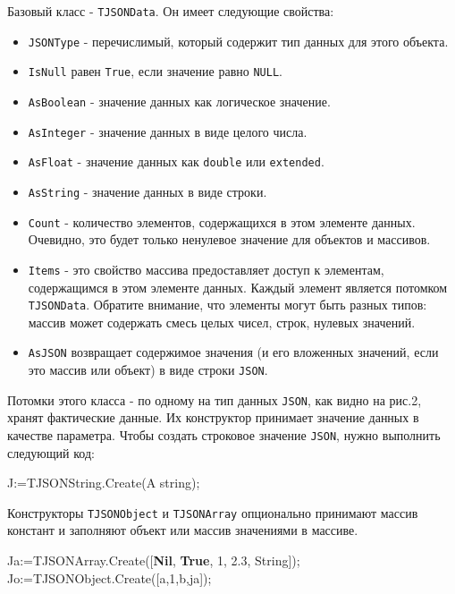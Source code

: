 \documentclass[
]{article}
\newenvironment{Shaded}{}{}
\newcommand{\DecValTok}[1]{\textcolor[rgb]{0.25,0.63,0.44}{#1}}
\newcommand{\KeywordTok}[1]{\textcolor[rgb]{0.00,0.44,0.13}{\textbf{#1}}}
\newcommand{\NormalTok}[1]{#1}
\newcommand{\StringTok}[1]{\textcolor[rgb]{0.25,0.44,0.63}{#1}}
\begin{document}
Базовый класс - \texttt{TJSONData}. Он имеет следующие свойства:

\begin{itemize}
\item
  \texttt{JSONType} - перечислимый, который содержит тип данных для
  этого объекта.
\item
  \texttt{IsNull} равен \texttt{True}, если значение равно
  \texttt{NULL}.
\item
  \texttt{AsBoolean} - значение данных как логическое значение.
\item
  \texttt{AsInteger} - значение данных в виде целого числа.
\item
  \texttt{AsFloat} - значение данных как \texttt{double} или
  \texttt{extended}.
\item
  \texttt{AsString} - значение данных в виде строки.
\item
  \texttt{Count} - количество элементов, содержащихся в этом элементе
  данных. Очевидно, это будет только ненулевое значение для объектов и
  массивов.
\item
  \texttt{Items} - это свойство массива предоставляет доступ к
  элементам, содержащимся в этом элементе данных. Каждый элемент
  является потомком \texttt{TJSONData}. Обратите внимание, что элементы
  могут быть разных типов: массив может содержать смесь целых чисел,
  строк, нулевых значений.
\item
  \texttt{AsJSON} возвращает содержимое значения (и его вложенных
  значений, если это массив или объект) в виде строки \texttt{JSON}.
\end{itemize}

Потомки этого класса - по одному на тип данных \texttt{JSON}, как видно
на рис.2, хранят фактические данные. Их конструктор принимает значение
данных в качестве параметра. Чтобы создать строковое значение
\texttt{JSON}, нужно выполнить следующий код:

\begin{Shaded}
\begin{Highlighting}[]
\NormalTok{J:=TJSONString.Create(}\StringTok{\textquotesingle{}A string\textquotesingle{}}\NormalTok{);}
\end{Highlighting}
\end{Shaded}

Конструкторы \texttt{TJSONObject} и \texttt{TJSONArray} опционально
принимают массив констант и заполняют объект или массив значениями в
массиве.

\begin{Shaded}
\begin{Highlighting}[]
\NormalTok{Ja:=TJSONArray.Create([}\KeywordTok{Nil}\NormalTok{, }\KeywordTok{True}\NormalTok{, }\DecValTok{1}\NormalTok{, }\DecValTok{2.3}\NormalTok{, }\StringTok{\textquotesingle{}String\textquotesingle{}}\NormalTok{]); }
\NormalTok{Jo:=TJSONObject.Create([}\StringTok{\textquotesingle{}a\textquotesingle{}}\NormalTok{,}\DecValTok{1}\NormalTok{,}\StringTok{\textquotesingle{}b\textquotesingle{}}\NormalTok{,ja]);}
\end{Highlighting}
\end{Shaded}
\end{document}
